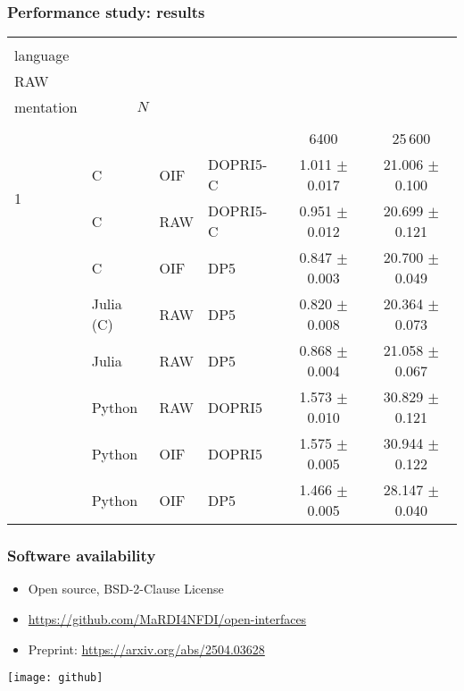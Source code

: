 \documentclass[
  10pt,
  aspectratio=169,
  english,
]{beamer}
\begin{document}
\begin{frame}
  \frametitle{Performance study: results}

  \newcommand{\myheader}{%
    \headerWithBreaks{0.2em}{\#} &
    \headerWithBreaks{3em}{User\\language} &
    \headerWithBreaks{1.5em}{OIF/\\RAW} &
    \headerWithBreaks{3em}{Imple-\\mentation} &
    \multicolumn{2}{c}{$N$} \\
    \cmidrule(lr){5-6}
  }
  \vspace{1em}
  \centering
  \begin{tabular}{l l l l c c}
    \toprule
    \myheader                                                                                    \\
                       &           &     &          & 6400                & 25\,600              \\
    \midrule
    \multirow{2}{*}{1} & C         & OIF & DOPRI5-C & 1.011 \(\pm\) 0.017 & 21.006 \(\pm\) 0.100 \\
                       & C         & RAW & DOPRI5-C & 0.951 \(\pm\) 0.012 & 20.699 \(\pm\) 0.121 \\
    \addlinespace
    \addlinespace
    \multirow{3}{*}{2} & C         & OIF & DP5      & 0.847 \(\pm\) 0.003 & 20.700 \(\pm\) 0.049 \\
                       & Julia (C) & RAW & DP5      & 0.820 \(\pm\) 0.008 & 20.364 \(\pm\) 0.073 \\
                       & Julia     & RAW & DP5      & 0.868 \(\pm\) 0.004 & 21.058 \(\pm\) 0.067 \\
    \addlinespace
    \addlinespace
    \multirow{3}{*}{3} & Python    & RAW & DOPRI5   & 1.573 \(\pm\) 0.010 & 30.829 \(\pm\) 0.121 \\
                       & Python    & OIF & DOPRI5   & 1.575 \(\pm\) 0.005 & 30.944 \(\pm\) 0.122 \\
                       & Python    & OIF & DP5      & 1.466 \(\pm\) 0.005 & 28.147 \(\pm\) 0.040 \\
    \bottomrule
  \end{tabular}
\end{frame}

% 

\begin{frame}
  \frametitle{Software availability}
  \begin{minipage}{0.618\textwidth}
    \begin{itemize}
      \item Open source, BSD-2-Clause License
      \item \url{https://github.com/MaRDI4NFDI/open-interfaces}
      \item Preprint: \url{https://arxiv.org/abs/2504.03628}
    \end{itemize}
  \end{minipage}%
  \begin{minipage}{0.382\textwidth}
    \texttt{[image: github]}
  \end{minipage}
\end{frame}
\end{document}
